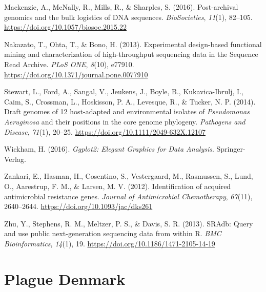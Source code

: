 \documentclass[
]{article}
\begin{document}
Mackenzie, A., McNally, R., Mills, R., \& Sharples, S. (2016).
Post-archival genomics and the bulk logistics of DNA sequences.
\emph{BioSocieties}, \emph{11}(1), 82--105.
\url{https://doi.org/10.1057/biosoc.2015.22}

Nakazato, T., Ohta, T., \& Bono, H. (2013). Experimental design-based
functional mining and characterization of high-throughput sequencing
data in the Sequence Read Archive. \emph{PLoS ONE}, \emph{8}(10),
e77910. \url{https://doi.org/10.1371/journal.pone.0077910}

Stewart, L., Ford, A., Sangal, V., Jeukens, J., Boyle, B.,
Kukavica-Ibrulj, I., Caim, S., Crossman, L., Hoskisson, P. A., Levesque,
R., \& Tucker, N. P. (2014). Draft genomes of 12 host-adapted and
environmental isolates of \emph{Pseudomonas} \emph{Aeruginosa} and their
positions in the core genome phylogeny. \emph{Pathogens and Disease},
\emph{71}(1), 20--25. \url{https://doi.org/10.1111/2049-632X.12107}

Wickham, H. (2016). \emph{Ggplot2: Elegant Graphics for Data Analysis}.
Springer-Verlag.

Zankari, E., Hasman, H., Cosentino, S., Vestergaard, M., Rasmussen, S.,
Lund, O., Aarestrup, F. M., \& Larsen, M. V. (2012). Identification of
acquired antimicrobial resistance genes. \emph{Journal of Antimicrobial
Chemotherapy}, \emph{67}(11), 2640--2644.
\url{https://doi.org/10.1093/jac/dks261}

Zhu, Y., Stephens, R. M., Meltzer, P. S., \& Davis, S. R. (2013). SRAdb:
Query and use public next-generation sequencing data from within R.
\emph{BMC Bioinformatics}, \emph{14}(1), 19.
\url{https://doi.org/10.1186/1471-2105-14-19}

\hypertarget{plague-denmark}{%
\section{Plague Denmark}\label{plague-denmark}}

\begin{appendix}
\end{appendix}


\label{NumDocumentPages}
\end{document}
